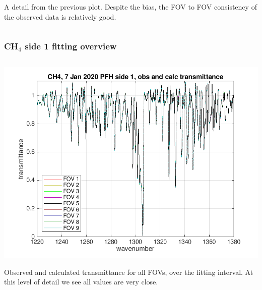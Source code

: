 \documentclass[10pt]{beamer}
\begin{document}
\begin{frame}
\begin{columns}[t]
\begin{column}{0.5\textwidth}
A detail from the previous plot. Despite the bias, the FOV to FOV
consistency of the observed data is relatively good.

\end{column}
\end{columns}
\end{frame}
\begin{frame}
\frametitle{CH$_4$  side 1 fitting overview}
\begin{columns}[t]
\begin{column}{0.5\textwidth}  
  \begin{centering}
  \includegraphics[width=\textwidth]{01-07_pfl_s1_CH4/CH4_obs_and_calc.png}
  \end{centering}\vspace{3mm}

Observed and calculated transmittance for all FOVs, over the fitting
interval.  At this level of detail we see all values are very close.

\end{column}


\end{columns}
\end{frame}
\end{document}
